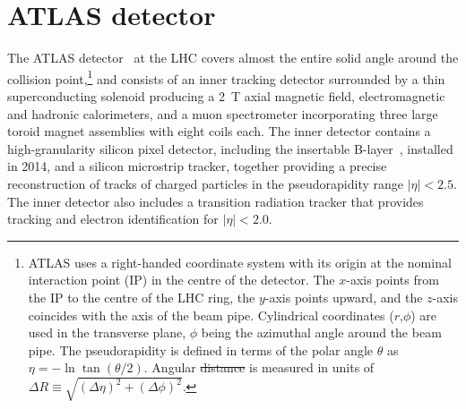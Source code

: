 \documentclass[PAPER, coverpage, atlasdraft=true, texlive=2016, UKenglish]{\ATLASLATEXPATH atlasdoc}
\providecommand{\DIFadd}[1]{{\protect\color{blue}\uwave{#1}}} %
\providecommand{\DIFdel}[1]{{\protect\color{red}\sout{#1}}}                      %
\providecommand{\DIFaddbegin}{} %
\providecommand{\DIFaddend}{} %
\providecommand{\DIFdelbegin}{} %
\providecommand{\DIFdelend}{} %
\begin{document}


\section{ATLAS detector}
\label{sec:detector}

The ATLAS detector~\cite{PERF-2007-01} at the LHC covers almost the entire solid angle around the collision point,\footnote{ATLAS 
uses a right-handed coordinate system with its origin at the nominal interaction point (IP) in the 
centre of the detector.  
The $x$-axis points from
the IP to the centre of the LHC ring, %
the $y$-axis points upward,
and the $z$-axis coincides with the axis of the beam pipe.
Cylindrical coordinates ($r$,$\phi$) are used 
in the transverse plane, $\phi$ being the azimuthal angle around the beam pipe. The pseudorapidity is defined in 
terms of the polar angle $\theta$ as $\eta = - \ln \tan(\theta/2)$.
Angular \DIFdelbegin \DIFdel{distance }\DIFdelend \DIFaddbegin \DIFadd{separation }\DIFaddend is measured in units of $\Delta R\equiv \sqrt{(\Delta\eta)^2+(\Delta\phi)^2}$.} and consists of an inner tracking detector surrounded by a thin superconducting solenoid producing a
2~T axial magnetic field, electromagnetic and hadronic calorimeters, and a muon spectrometer incorporating three large toroid magnet assemblies with eight coils each. The inner detector contains a high-granularity silicon pixel detector, including the %
insertable B-layer~\cite{IBL1,IBL2,Abbott:2018ikt}, installed in 2014, and a silicon microstrip tracker, together providing a precise reconstruction of tracks of charged particles in the pseudorapidity range $|\eta|<2.5$.
The inner detector also includes a transition radiation tracker that provides tracking and electron identification for $|\eta|<2.0$.
\end{document}
